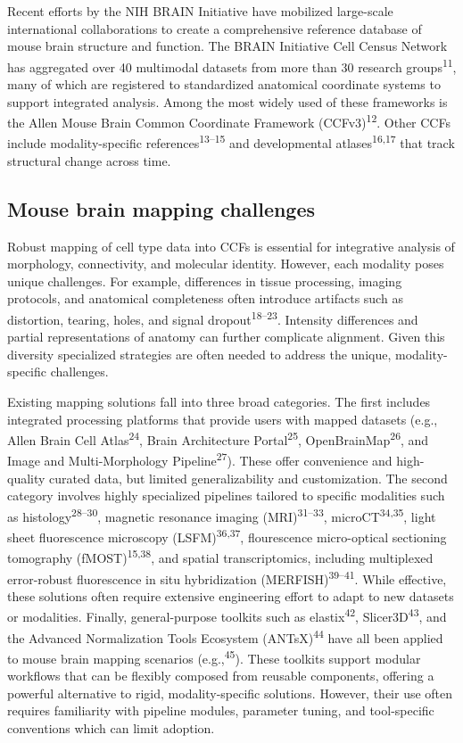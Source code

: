 \documentclass[
  12pt,
]{article}
\begin{document}
Recent efforts by the NIH BRAIN Initiative have mobilized large-scale
international collaborations to create a comprehensive reference
database of mouse brain structure and function. The BRAIN Initiative
Cell Census Network has aggregated over 40 multimodal datasets from more
than 30 research groups\textsuperscript{11}, many of which are
registered to standardized anatomical coordinate systems to support
integrated analysis. Among the most widely used of these frameworks is
the Allen Mouse Brain Common Coordinate Framework
(CCFv3)\textsuperscript{12}. Other CCFs include modality-specific
references\textsuperscript{13--15} and developmental
atlases\textsuperscript{16,17} that track structural change across time.

\subsection{Mouse brain mapping
challenges}\label{mouse-brain-mapping-challenges}

Robust mapping of cell type data into CCFs is essential for integrative
analysis of morphology, connectivity, and molecular identity. However,
each modality poses unique challenges. For example, differences in
tissue processing, imaging protocols, and anatomical completeness often
introduce artifacts such as distortion, tearing, holes, and signal
dropout\textsuperscript{18--23}. Intensity differences and partial
representations of anatomy can further complicate alignment. Given this
diversity specialized strategies are often needed to address the unique,
modality-specific challenges.

Existing mapping solutions fall into three broad categories. The first
includes integrated processing platforms that provide users with mapped
datasets (e.g., Allen Brain Cell Atlas\textsuperscript{24}, Brain
Architecture Portal\textsuperscript{25},
OpenBrainMap\textsuperscript{26}, and Image and Multi-Morphology
Pipeline\textsuperscript{27}). These offer convenience and high-quality
curated data, but limited generalizability and customization. The second
category involves highly specialized pipelines tailored to specific
modalities such as histology\textsuperscript{28--30}, magnetic resonance
imaging (MRI)\textsuperscript{31--33}, microCT\textsuperscript{34,35},
light sheet fluorescence microscopy (LSFM)\textsuperscript{36,37},
flourescence micro-optical sectioning tomography
(fMOST)\textsuperscript{15,38}, and spatial transcriptomics, including
multiplexed error-robust fluorescence in situ hybridization
(MERFISH)\textsuperscript{39--41}. While effective, these solutions
often require extensive engineering effort to adapt to new datasets or
modalities. Finally, general-purpose toolkits such as
elastix\textsuperscript{42}, Slicer3D\textsuperscript{43}, and the
Advanced Normalization Tools Ecosystem (ANTsX)\textsuperscript{44} have
all been applied to mouse brain mapping scenarios
(e.g.,\textsuperscript{45}). These toolkits support modular workflows
that can be flexibly composed from reusable components, offering a
powerful alternative to rigid, modality-specific solutions. However,
their use often requires familiarity with pipeline modules, parameter
tuning, and tool-specific conventions which can limit adoption.
\end{document}
